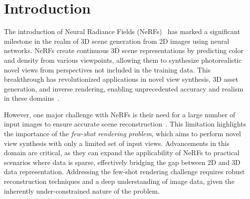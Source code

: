 \vspace{-1em}
\section{Introduction}
\label{sec:intro}



The introduction of Neural Radiance Fields (NeRFs)~\cite{mildenhall2020nerf} has marked a significant milestone in the realm of 3D scene generation from 2D images using neural networks.
NeRFs create continuous 3D scene representations by predicting color and density from various viewpoints, allowing them to synthesize photorealistic novel views from perspectives not included in the training data.
This breakthrough has revolutionized applications in novel view synthesis, 3D asset generation, and inverse rendering, enabling unprecedented accuracy and realism in these domains~\cite{mueller2022instant,Jin2023TensoIR,NeRFshop23}.

However, one major challenge with NeRFs is their need for a large number of input images to ensure accurate scene reconstruction~\cite{yu2021pixelnerf,yang2023freenerf}.
This limitation highlights the importance of the \textit{few-shot rendering problem}, which aims to perform novel view synthesis with only a limited set of input views. Advancements in this domain are critical, as they can expand the applicability of NeRFs to practical scenarios where data is sparse, effectively bridging the gap between 2D and 3D data representation. Addressing the few-shot rendering challenge requires robust reconstruction techniques and a deep understanding of image data, given the inherently under-constrained nature of the problem.

